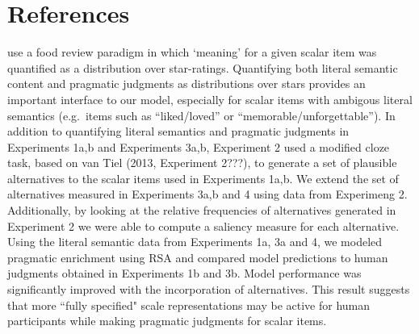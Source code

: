 \documentclass[10pt, letterpaper]{article}
\begin{document}
\section{References}\label{references}

\setlength{\parindent}{-0.1in} \setlength{\leftskip}{0.125in} \noindent

use a food review paradigm in which `meaning' for a given scalar item
was quantified as a distribution over star-ratings. Quantifying both
literal semantic content and pragmatic judgments as distributions over
stars provides an important interface to our model, especially for
scalar items with ambigous literal semantics (e.g.~items such as
``liked/loved'' or ``memorable/unforgettable''). In addition to
quantifying literal semantics and pragmatic judgments in Experiments
1a,b and Experiments 3a,b, Experiment 2 used a modified cloze task,
based on van Tiel (2013, Experiment 2???), to generate a set of
plausible alternatives to the scalar items used in Experiments 1a,b. We
extend the set of alternatives measured in Experiments 3a,b and 4 using
data from Experimeng 2. Additionally, by looking at the relative
frequencies of alternatives generated in Experiment 2 we were able to
compute a saliency measure for each alternative. Using the literal
semantic data from Experiments 1a, 3a and 4, we modeled pragmatic
enrichment using RSA and compared model predictions to human judgments
obtained in Experiments 1b and 3b. Model performance was significantly
improved with the incorporation of alternatives. This result suggests
that more ``fully specified" scale representations may be active for
human participants while making pragmatic judgments for scalar items.
\end{document}
